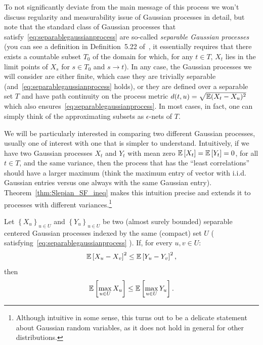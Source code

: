 To not significantly deviate from the main message of this process we won't discuss regularity and measurability issue of Gaussian processes in detail, but note that the standard class of Gaussian processes that satisfy~\eqref{eq:separablegaussianprocess} are so-called \emph{separable Gaussian processes} (you can see a definition in Definition~5.22 of~\cite{vanHandel_LectureNotesProb_14}, it essentially requires that there exists a countable subset $T_0$ of the domain for which, for any $t\in T$, $X_t$ lies in the limit points of $X_s$ for $s\in T_0$ and $s\to t$). In any case, the Gaussian processes we will consider are either finite, which case they are trivially separable (and~\eqref{eq:separablegaussianprocess} holds), or they are defined over a separable set $T$ and have path continuity on the process metric $d(t,u) = \sqrt{\mathbb{E}(X_t-X_u)^2}$ which also ensures~\eqref{eq:separablegaussianprocess}. In most cases, in fact, one can simply think of the approximating subsets as $\epsilon$-nets of $T$.

We will be particularly interested in comparing two different Gaussian processes, usually one of interest with one that is simpler to understand. 
Intuitively, if we have two Gaussian processes $X_t$ and $Y_t$ with mean zero $\mathbb{E}\left[X_t\right] = \mathbb{E}\left[Y_t\right] = 0$, for all $t\in T$, and the same variance, then the process that has the ``least correlations'' should have a larger maximum (think the maximum entry of vector with i.i.d. Gaussian entries versus one always with the same Gaussian entry). Theorem~\ref{thm:Slepian_SF_ineq} makes this intuition precise and extends it to processes with different variances.\footnote{Although intuitive in some sense, this turns out to be a delicate statement about Gaussian random variables, as it does not hold in general for other distributions.}



\begin{theorem}\label{thm:Slepian_SF_ineq}

Let $\left\{X_u\right\}_{u\in U}$ and $\left\{Y_u\right\}_{u\in U}$ be two (almost surely bounded) separable centered Gaussian processes indexed by the same (compact) set $U$ (
satisfying~\eqref{eq:separablegaussianprocess}
). If, for every $u,v\in U$:
\begin{equation}
\mathbb{E}\left[X_{u}-X_{v}\right]^2 \leq  \mathbb{E}\left[Y_{u}-Y_{v}\right]^2,
\end{equation}
then
\[
 \mathbb{E}\left[\max_{u\in U}X_u\right] \leq \mathbb{E}\left[\max_{u\in U}Y_u\right].
\]
\end{theorem}

